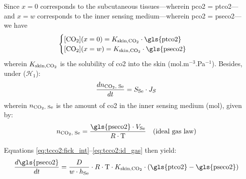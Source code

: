 Since $x=0$ corresponds to the subcutaneous tissues---wherein \gls{pco2} = \gls{ptco2}---and $x=w$ corresponds to the inner sensing medium---wherein \gls{pco2} = \gls{pseco2}---we have
\begin{equation}\label{eq:tcco2:conc_boundaries}
	\begin{cases}
		\ce{[CO_2]}(x=0) = K_\text{skin,\ce{CO_2}} \cdot \text{\gls{ptco2}}\\
		\ce{[CO_2]}(x=w) = K_\text{skin,\ce{CO_2}} \cdot \text{\gls{pseco2}}
	\end{cases}
\end{equation}
wherein $K_\text{skin,\ce{CO_2}}$ is the solubility of \gls{co2} into the skin (mol.m$^{-3}$.Pa$^{-1}$). Besides, under ($\mathcal{H}_1$):
\begin{equation}\label{eq:tcco2:fluxes_int}
	\frac{d n_\text{\ce{CO_2}, Se}}{dt} = S_\text{Se} \cdot J_S 
\end{equation}
wherein $n_\text{\ce{CO_2}, Se}$ is the amount of \gls{co2} in the inner sensing medium (mol), given by:
\begin{equation}\label{eq:tcco2:id_gas}
	n_\text{\ce{CO_2}, Se} = \frac{\text{\gls{pseco2}} \cdot V_\text{Se}}{R \cdot \text{T}} \quad \text{(ideal gas law)}
\end{equation}

Equations \ref{eq:tcco2:fick_int}--\ref{eq:tcco2:id_gas} then yield:
\begin{equation}
	\frac{d \text{\gls{pseco2}}}{dt} = \frac{D}{w \cdot h_\text{Se}} \cdot R \cdot \text{T} \cdot K_\text{skin,\ce{CO_2}} \cdot \left( \text{\gls{ptco2}} - \text{\gls{pseco2}} \right)
\end{equation}

